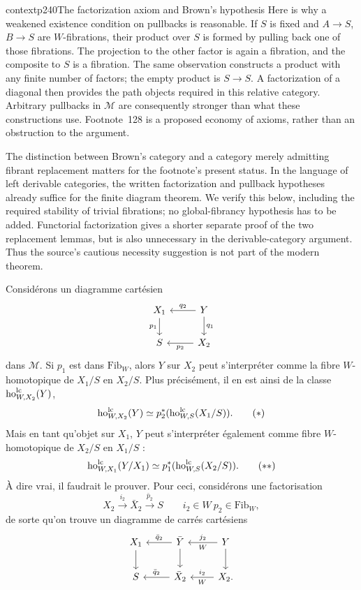 \begin{dcomment}{context}{p240}{The factorization axiom and Brown's hypothesis}
Here is why a weakened existence condition on pullbacks is reasonable. If $S$ is fixed and $A\to S$, $B\to S$ are $W$-fibrations, their product over $S$ is formed by pulling back one of those fibrations. The projection to the other factor is again a fibration, and the composite to $S$ is a fibration. The same observation constructs a product with any finite number of factors; the empty product is $S\to S$. A factorization of a diagonal then provides the path objects required in this relative category. Arbitrary pullbacks in $\mathcal M$ are consequently stronger than what these constructions use. Footnote~128 is a proposed economy of axioms, rather than an obstruction to the argument.

The distinction between Brown's category and a category merely admitting fibrant replacement matters for the footnote's present status. In the language of left derivable categories, the written factorization and pullback hypotheses already suffice for the finite diagram theorem. We verify this below, including the required stability of trivial fibrations; no global-fibrancy hypothesis has to be added. Functorial factorization gives a shorter separate proof of the two replacement lemmas, but is also unnecessary in the derivable-category argument. Thus the source's cautious necessity suggestion is not part of the modern theorem.
\end{dcomment}


Considérons un diagramme cartésien
\[
\begin{tikzcd}[ampersand replacement=\&]
X_1 \arrow[d, "p_1"'] \& Y \arrow[l, "q_2"'] \arrow[d, "q_1"] \\
S \& X_2 \arrow[l, "p_2"]
\end{tikzcd}
\]
dans $\mathcal{M}$. Si $p_1$ est dans $\mathrm{Fib}_W$, alors $Y$ sur $X_2$ peut s'interpréter comme la fibre $W$-homotopique de $X_1/S$ en $X_2/S$. Plus précisément, il en est ainsi de la classe $\mathrm{ho}^{\mathrm{lc}}_{W,X_2}(Y)$,
\[
\ho^{\lc}_{W,X_2}(Y) \simeq p_2^*(\ho^{\lc}_{W,S}(X_1/S)). \tag*{$(*)$}
\]
Mais en tant qu'objet sur $X_1$, $Y$ peut s'interpréter également comme fibre $W$-homotopique de $X_2/S$ en $X_1/S$ :
\[
\ho^{\lc}_{W,X_1}(Y/X_1) \simeq p_1^*(\ho^{\lc}_{W,S}(X_2/S)). \tag*{$(**)$}
\]
À dire vrai, il faudrait le prouver. Pour ceci, considérons une factorisation
\[
X_2 \xrightarrow{i_2} \bar{X}_2 \xrightarrow{\bar{p}_2} S \qquad i_2 \in W\ p_2 \in \mathrm{Fib}_W, %
\]
de sorte qu'on trouve un diagramme de carrés cartésiens
\[
\begin{tikzcd}[ampersand replacement=\&]
X_1 \arrow[d] \& \bar{Y} \arrow[l, "\bar{q}_2"'] \arrow[d] \& Y \arrow[l, "j_2"', "W"] \arrow[d] \\
S \& \bar{X}_2 \arrow[l, "\bar{q}_2"'] \& X_2. \arrow[l, "i_2"', "W"] %
\end{tikzcd}
\]

